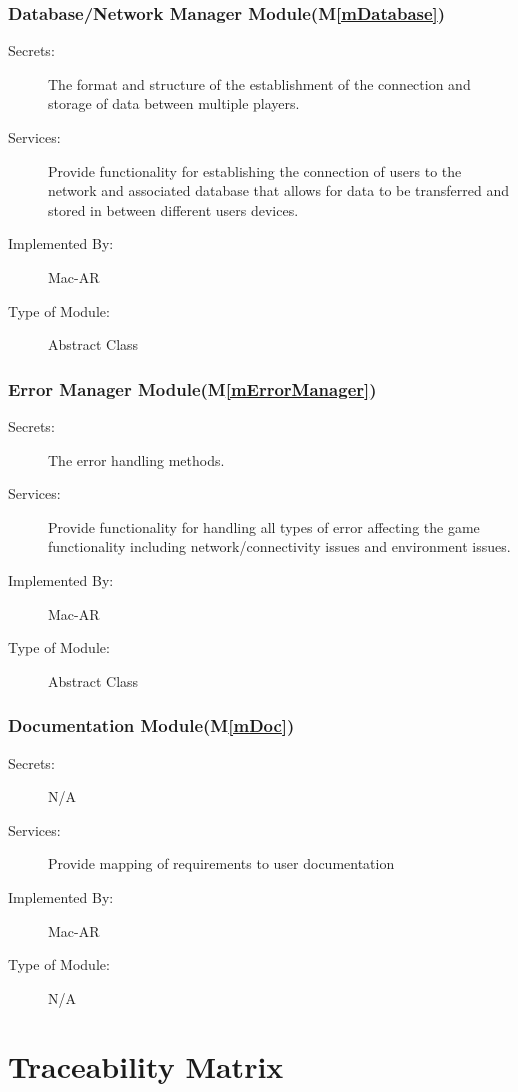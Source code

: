 \documentclass[12pt, titlepage]{article}
\newcommand{\mref}[1]{M\ref{#1}}
\begin{document}
\subsubsection{Database/Network Manager Module(\mref{mDatabase})}
\begin{description}
\item[Secrets:]The format and structure of the establishment of the connection and storage of data between multiple players.
\item[Services:]Provide functionality for establishing the connection of users to the network and associated database that allows for data to be transferred and stored in between different users devices.
\item[Implemented By:] Mac-AR
\item[Type of Module:] Abstract Class
\end{description}

\subsubsection{Error Manager Module(\mref{mErrorManager})}
\begin{description}
\item[Secrets:]The error handling methods.
\item[Services:]Provide functionality for handling all types of error affecting the game functionality including network/connectivity issues and environment issues.
\item[Implemented By:] Mac-AR
\item[Type of Module:] Abstract Class
\end{description}

\subsubsection{Documentation Module(\mref{mDoc})}
\begin{description}
\item[Secrets:] N/A
\item[Services:]Provide mapping of requirements to user documentation
\item[Implemented By:] Mac-AR
\item[Type of Module:] N/A
\end{description}

\section{Traceability Matrix} \label{SecTM}
\end{document}
